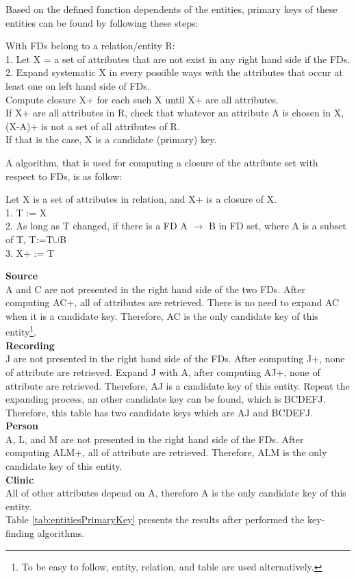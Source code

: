 Based on the defined function dependents of the entities, primary keys of these entities can be found by following these steps\cite{INF3100_Recipe_book}:
\begin{adjustwidth}{1cm}{}
With FDs belong to a relation/entity R:\\
1. Let X = a set of attributes that are not exist in any right hand side if the FDs.\\
2. Expand systematic X in every possible ways with the attributes that occur at least one on left hand side of FDs.\\
Compute closure X+ for each such X until X+ are all attributes.\\
If X+ are all attributes in R, check that whatever an attribute A is chosen in X, (X-A)+ is not a set of all attributes of R.\\
If that is the case, X is a candidate (primary) key.
\end{adjustwidth}
A algorithm, that is used for computing a closure of the attribute set with respect to FDs, is as follow\cite{INF3100_Recipe_book}:
\begin{adjustwidth}{1cm}{}
Let X is a set of attributes in relation, and X+ is a closure of X.\\
1. T := X\\
2. As long as T changed, if there is a FD A $\rightarrow$ B in FD set, where A is a subset of T, T:=T$\cup$B\\
3. X+ := T
\end{adjustwidth}

\textbf{Source}\\
A and C are not presented in the right hand side of the two FDs. After computing AC+, all of attributes are retrieved. There is no need to expand AC when it is a candidate key.
Therefore, AC is the only candidate key of this entity\footnote{To be easy to follow, entity, relation, and table are used alternatively.}.\\
\textbf{Recording}\\
J are not presented in the right hand side of the FDs. After computing J+, none of attribute are retrieved. Expand J with A, after computing AJ+, none of attribute are retrieved. Therefore, AJ is a candidate key of this entity. Repeat the expanding process, an other candidate key can be found, which is BCDEFJ. Therefore, this table has two candidate keys which are AJ and BCDEFJ.\\
\textbf{Person}\\
A, L, and M are not presented in the right hand side of the FDs. After computing ALM+, all of attribute are retrieved. Therefore, ALM is the only candidate key of this entity.\\
\textbf{Clinic}\\
All of other attributes depend on A, therefore A is the only candidate key of this entity.\\
Table \ref{tab:entitiesPrimaryKey} presents the results after performed the key-finding algorithms.\\

